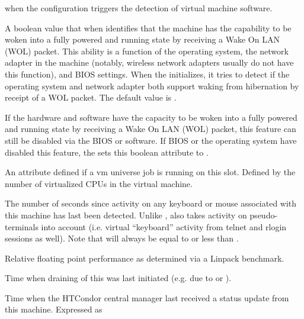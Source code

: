 \begin{description}
when the configuration triggers the detection of virtual machine
software.
%
\item[\AdAttr{IsWakeAble}:] A boolean value that when  identifies
that the machine has the capability to be woken into a 
fully powered and running state by receiving a Wake On LAN (WOL) packet.
This ability is a function of the operating system, 
the network adapter in the machine 
(notably, wireless network adapters usually do not have this function),
and BIOS settings. 
When the  initializes, 
it tries to detect if the operating system and network adapter both support 
waking from hibernation by receipt of a WOL packet.
The default value is .
%
\item[\AdAttr{IsWakeEnabled}:] If the hardware and software have the capacity 
to be woken into a fully powered and running state by receiving 
a Wake On LAN (WOL) packet,
this feature can still be disabled via the BIOS or software.
If BIOS or the operating system have disabled this feature, 
the  sets this boolean attribute to .
%
\item[\AdAttr{JobVM\_VCPUS}:] An attribute defined if a vm universe job
is running on this slot.  Defined by the number of virtualized CPUs
in the virtual machine.
%
\item[\AdAttr{KeyboardIdle}:] The number of seconds since activity on any
keyboard or mouse associated with this machine has last been detected.
Unlike ,  also takes activity 
on pseudo-terminals into
account (i.e. virtual ``keyboard'' activity from telnet and rlogin
sessions as well).  Note that  will always be equal to or
less than .
%
\item[\AdAttr{KFlops}:] Relative floating point performance as determined via a
Linpack benchmark.
%
\item[\AdAttr{LastDrainStartTime}:] Time when draining of this
 was last initiated (e.g. due to  or
).
%
\item[\AdAttr{LastHeardFrom}:] Time when the HTCondor central manager last
received a status update from this machine.  
Expressed as 

\end{description}

